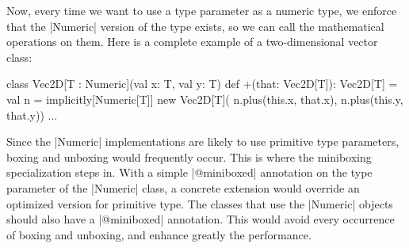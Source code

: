 Now, every time we want to use a type parameter as a numeric type, we enforce that the |Numeric| version of the type exists, so we can call the mathematical operations on them. Here is a complete example of a two-dimensional vector class:

\begin{lstlisting-nobreak}
 class Vec2D[T : Numeric](val x: T, val y: T) {
   def +(that: Vec2D[T]): Vec2D[T] = {
     val n = implicitly[Numeric[T]]
     new Vec2D[T](
       n.plus(this.x, that.x),
       n.plus(this.y, that.y))
   }
   ...
 }
\end{lstlisting-nobreak}

Since the |Numeric| implementations are likely to use primitive type parameters, boxing and unboxing would frequently occur. This is where the miniboxing specialization steps in. With a simple |@miniboxed| annotation on the type parameter of the |Numeric| class, a concrete extension would override an optimized version for primitive type. The classes that use the |Numeric| objects should also have a |@miniboxed| annotation. This would avoid every occurrence of boxing and unboxing, and enhance greatly the performance.